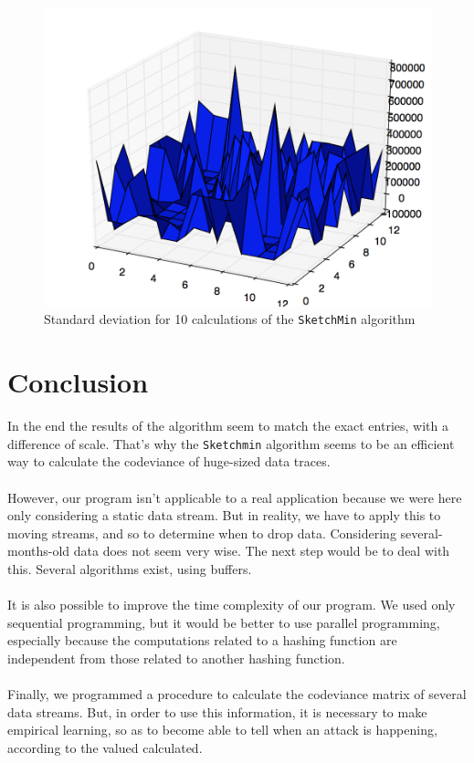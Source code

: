 \documentclass[a4paper]{article}%
\begin{document}
\begin{figure}[H]
	\center
	\includegraphics[scale=0.25]{generated10times.png}
	\caption{\footnotesize Standard deviation for 10 calculations of the \texttt{SketchMin} algorithm}
	\label{ref:exp_artificial_stdev}
\end{figure}


\section*{Conclusion}

In the end the results of the algorithm seem to match the exact entries, with a difference of scale. That's why the \texttt{Sketchmin} algorithm seems to be an efficient way to calculate the codeviance of huge-sized data traces.

\paragraph{}However, our program isn't applicable to a real application because we were here only considering a static data stream. But in reality, we have to apply this to moving streams, and so to determine when to drop data. Considering several-months-old data does not seem very wise. The next step would be to deal with this. Several algorithms exist, using buffers.

\paragraph{}It is also possible to improve the time complexity of our program. We used only sequential programming, but it would be better to use parallel programming, especially because the computations related to a hashing function are independent from those related to another hashing function.

\paragraph{}Finally, we programmed a procedure to calculate the codeviance matrix of several data streams. But, in order to use this information, it is necessary to make empirical learning, so as to become able to tell when an attack is happening, according to the valued calculated.


\clearpage
\end{document}
